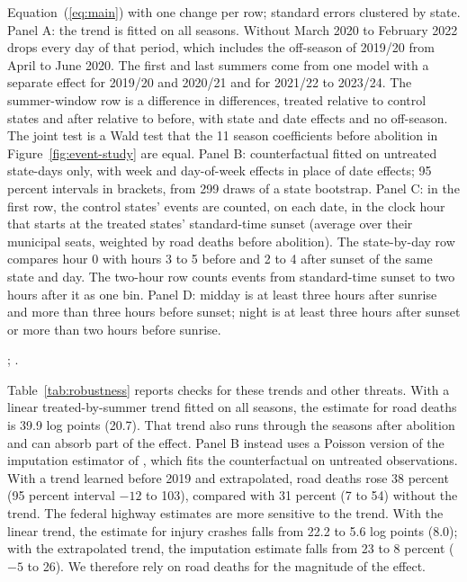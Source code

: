 \begin{table}[tbp]
  \caption{The Hour after Sunset under Other Choices, and Hours Whose Light Did Not Change}
  \label{tab:robustness}
  \centering\footnotesize\setlength{\tabcolsep}{5pt}
  
  \begin{tablenotes}[Notes]
  Equation~(\ref{eq:main}) with one change per row; standard errors clustered by state. Panel A: the trend is fitted on all seasons. Without March 2020 to February 2022 drops every day of that period, which includes the off-season of 2019/20 from April to June 2020. The first and last summers come from one model with a separate effect for 2019/20 and 2020/21 and for 2021/22 to 2023/24. The summer-window row is a difference in differences, treated relative to control states and after relative to before, with state and date effects and no off-season. The joint test is a Wald test that the 11 season coefficients before abolition in Figure~\ref{fig:event-study} are equal. Panel B: counterfactual fitted on untreated state-days only, with week and day-of-week effects in place of date effects; 95 percent intervals in brackets, from 299 draws of a state bootstrap. Panel C: in the first row, the control states' events are counted, on each date, in the clock hour that starts at the treated states' standard-time sunset (average over their municipal seats, weighted by road deaths before abolition). The state-by-day row compares hour 0 with hours 3 to 5 before and 2 to 4 after sunset of the same state and day. The two-hour row counts events from standard-time sunset to two hours after it as one bin. Panel D: midday is at least three hours after sunrise and more than three hours before sunset; night is at least three hours after sunset or more than two hours before sunrise.
  \end{tablenotes}
  \begin{tablenotes}[Sources]
  \citet{datasus2025sim}; \citet{prf2025dados}.
  \end{tablenotes}
\end{table}

Table~\ref{tab:robustness} reports checks for these trends and other threats. With a linear treated-by-summer trend fitted on all seasons, the estimate for road deaths is 39.9 log points (20.7). That trend also runs through the seasons after abolition and can absorb part of the effect. Panel B instead uses a Poisson version of the imputation estimator of \citet{borusyak2024revisiting}, which fits the counterfactual on untreated observations. With a trend learned before 2019 and extrapolated, road deaths rose 38 percent (95 percent interval $-12$ to 103), compared with 31 percent (7 to 54) without the trend. The federal highway estimates are more sensitive to the trend. With the linear trend, the estimate for injury crashes falls from 22.2 to 5.6 log points (8.0); with the extrapolated trend, the imputation estimate falls from 23 to 8 percent ($-5$ to 26). We therefore rely on road deaths for the magnitude of the effect.


